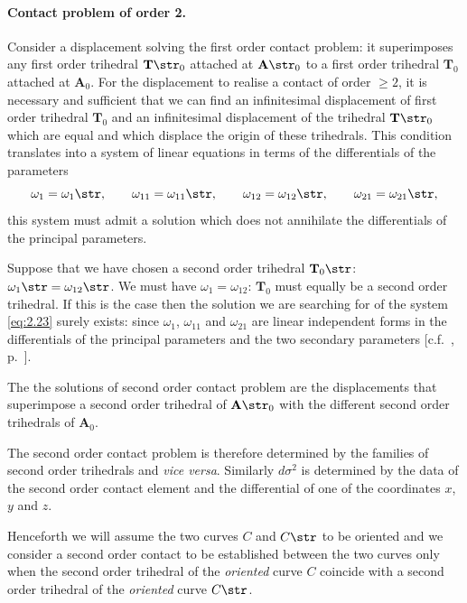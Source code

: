 \paragraph{Contact problem of order 2.}
\label{sec:33}
Consider a displacement solving the first order contact problem: it superimposes any first order trihedral $\mathbf{T}\str_{0}$ attached at $\mathbf{A}\str_{0}$ to a first order trihedral $\mathbf{T}_{0}$ attached at $\mathbf{A}_{0}$. For the displacement to realise a contact of order $\ge 2$, it is necessary and sufficient that we can find an infinitesimal displacement of first order trihedral $\mathbf{T}_{0}$ and an infinitesimal displacement of the trihedral $\mathbf{T}\str_{0}$ which are equal and which displace the origin of these trihedrals. This condition translates into a system of linear equations in terms of the differentials of the parameters
\begin{equation}
  \label{eq:2.23}
  \omega_{1}=\omega_{1}\str,\qquad\omega_{11}=\omega_{11}\str,\qquad\omega_{12}=\omega_{12}\str,\qquad\omega_{21}=\omega_{21}\str,
\end{equation}
this system must admit a solution which does not annihilate the differentials of the principal parameters.

Suppose that we have chosen a second order trihedral $\mathbf{T}_{0}\str$: $\omega_{1}\str=\omega_{12}\str$. We must have $\omega_{1}=\omega_{12}$: $\mathbf{T}_{0}$ must equally be a second order trihedral. If this is the case then the solution we are searching for of the system \eqref{eq:2.23} surely exists: since $\omega_{1}$, $\omega_{11}$ and $\omega_{21}$ are linear independent forms in the differentials of the principal parameters and the two secondary parameters [c.f.~, p.~\pageref{sec:31}].

The the solutions of second order contact problem are the displacements that superimpose a second order trihedral of $\mathbf{A}\str_{0}$ with the different second order trihedrals of $\mathbf{A}_{0}$.

The second order contact problem is therefore determined by the families of second order trihedrals and \emph{vice versa}. Similarly $d\sigma^{2}$ is determined by the data of the second order contact element and the differential of one of the coordinates $x$, $y$ and $z$.

Henceforth we will assume the two curves $C$ and $C\str$ to be oriented and we consider a second order contact to be established between the two curves only when the second order trihedral of the \emph{oriented} curve $C$ coincide with a second order trihedral of the \emph{oriented} curve $C\str$.


